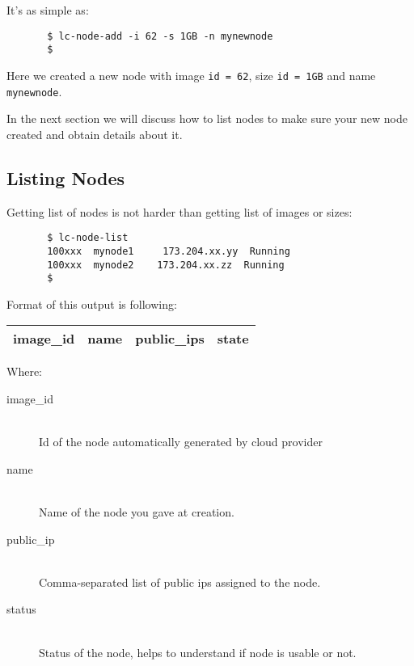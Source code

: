 \documentclass[a4paper]{report}
\begin{document}
       It's as simple as:

       \begin{verbatim}
       $ lc-node-add -i 62 -s 1GB -n mynewnode
       $
       \end{verbatim}

       Here we created a new node with image \texttt{id = 62}, size
       \texttt{id = 1GB} and name \texttt{mynewnode}.

       In the next section we will discuss how to list nodes to make
       sure your new node created and obtain details about it.

       \subsection{Listing Nodes}
       Getting list of nodes is not harder than getting list of images
       or sizes:

       \begin{verbatim}
       $ lc-node-list
       100xxx  mynode1     173.204.xx.yy  Running
       100xxx  mynode2    173.204.xx.zz  Running
       $
       \end{verbatim}

       Format of this output is following:

       \begin{center}
         \begin{tabular}{ | c | c | c | c | }
           \hline
             image\_id & name & public\_ips & state \\
           \hline
         \end{tabular}
       \end{center}

       Where:

       \begin{description}
          \item[image\_id] \hfill \\
          Id of the node automatically generated by cloud provider
          \item[name] \hfill \\
          Name of the node you gave at creation.
          \item[public\_ip] \hfill \\
          Comma-separated list of public ips assigned to the node.
          \item[status] \hfill \\
          Status of the node, helps to understand if node is usable or not.
       \end{description}
\end{document}
